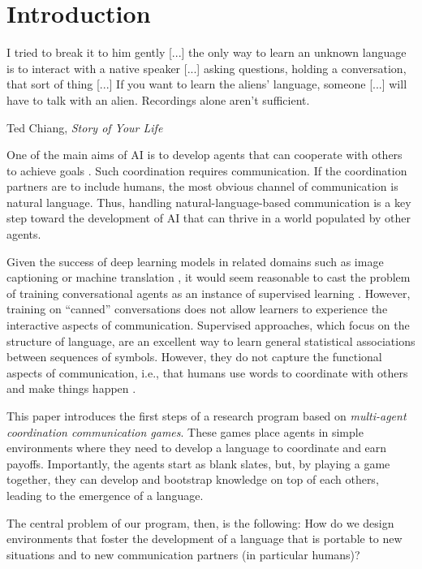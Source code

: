 \section{Introduction}

\begin{displayquote}
I tried to break it to him gently [...] the only way to learn an unknown language is to interact with a native speaker [...] asking questions, holding a conversation, that sort of thing [...] If you want to learn the aliens' language, someone [...] will have to talk with an alien. Recordings alone aren't sufficient.

Ted Chiang, \emph{Story of Your Life}
\end{displayquote}

One of the main aims of AI is to develop agents that can cooperate with others to achieve goals \citep{wooldridge2009introduction}. Such coordination requires communication. If the coordination partners are to include humans, the most obvious channel of communication is natural language. Thus, handling natural-language-based communication is a key step toward the development of AI that can thrive in a world populated by other agents.

Given the success of deep learning models in related domains such as image captioning or machine
translation \citep[e.g.,][]{Sutskever:etal:2014,Xu:etal:2015}, it
would seem reasonable to cast the problem of training conversational
agents as an instance of supervised learning \citep{Vinyals:Le:2015}.
However, training on ``canned''
conversations does not allow learners to experience the interactive
aspects of communication. Supervised approaches, which focus on
the structure of language, are an excellent way to learn
general statistical associations between sequences of symbols. However, they do
not capture the functional aspects of communication, i.e., 
that humans use words to coordinate with others and 
make things happen \citep{Austin:1962,clark1996using,Wittgenstein:1953}.

This paper introduces the first steps of a research program based on
\textit{multi-agent coordination communication games}. These games
place agents in simple environments where they need to develop a language to 
coordinate and earn payoffs. Importantly, the agents start as blank slates,
but, by playing a game together, they can develop and bootstrap
knowledge on top of each others, leading to the emergence of a
language.

The central problem of our program, then, is the following: How do we
design environments that foster the development of a language that is
portable to new situations and to new communication partners (in
particular humans)?

